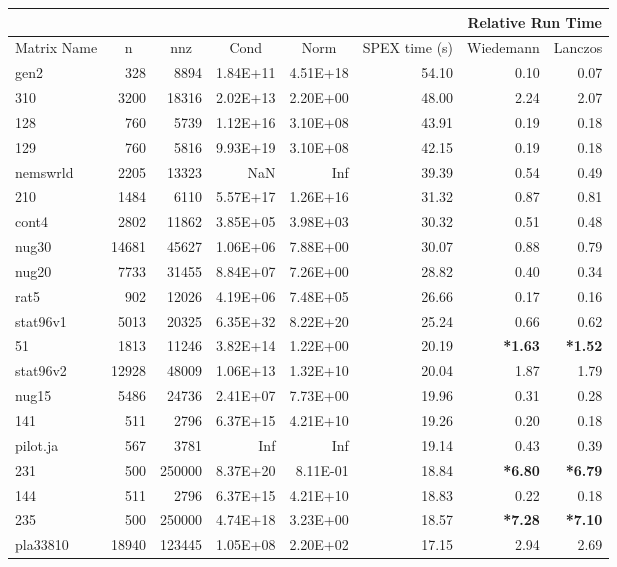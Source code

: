 \documentclass[10pt]{article}
\newcommand{\red}{
	\color{red}	
	}
\begin{document}
\begin{longtable}{|l|r|r|r|r|r|r|r|}
\hline	
& & & & & & \multicolumn{2}{c|}{Relative Run Time}  \\ \hline
\multicolumn{1}{|c|}{Matrix Name}	& \multicolumn{1}{c|}{n} & \multicolumn{1}{c|}{nnz} & \multicolumn{1}{c|}{Cond} & \multicolumn{1}{c|}{Norm} & \multicolumn{1}{c|}{SPEX time (s)} & \multicolumn{1}{c|}{Wiedemann} & \multicolumn{1}{c|}{Lanczos} \\  \hline \endhead
gen2	&	328	&	8894	&	1.84E+11	&	4.51E+18	&	54.10	&	0.10	&	0.07	\\
310	&	3200	&	18316	&	2.02E+13	&	2.20E+00	&	48.00	&	2.24	&	2.07	\\
128	&	760	&	5739	&	1.12E+16	&	3.10E+08	&	43.91	&	0.19	&	0.18	\\
129	&	760	&	5816	&	9.93E+19	&	3.10E+08	&	42.15	&	0.19	&	0.18	\\
nemswrld	&	2205	&	13323	&	NaN	&	Inf	&	39.39	&	0.54	&	0.49	\\
210	&	1484	&	6110	&	5.57E+17	&	1.26E+16	&	31.32	&	0.87	&	0.81	\\
cont4	&	2802	&	11862	&	3.85E+05	&	3.98E+03	&	30.32	&	0.51	&	0.48	\\
nug30	&	14681	&	45627	&	1.06E+06	&	7.88E+00	&	30.07	&	0.88	&	0.79	\\
nug20	&	7733	&	31455	&	8.84E+07	&	7.26E+00	&	28.82	&	0.40	&	0.34	\\
rat5	&	902	&	12026	&	4.19E+06	&	7.48E+05	&	26.66	&	0.17	&	0.16	\\
stat96v1	&	5013	&	20325	&	6.35E+32	&	8.22E+20	&	25.24	&	0.66	&	0.62	\\
51	&	1813	&	11246	&	3.82E+14	&	1.22E+00	&	20.19	&	{\bf \red *1.63}	&	{\bf \red *1.52}	\\
stat96v2	&	12928	&	48009	&	1.06E+13	&	1.32E+10	&	20.04	&	1.87	&	1.79	\\
nug15	&	5486	&	24736	&	2.41E+07	&	7.73E+00	&	19.96	&	0.31	&	0.28	\\
141	&	511	&	2796	&	6.37E+15	&	4.21E+10	&	19.26	&	0.20	&	0.18	\\
pilot.ja	&	567	&	3781	&	Inf	&	Inf	&	19.14	&	0.43	&	0.39	\\
231	&	500	&	250000	&	8.37E+20	&	8.11E-01	&	18.84	&	{\bf \red *6.80}	&	{\bf \red *6.79}	\\
144	&	511	&	2796	&	6.37E+15	&	4.21E+10	&	18.83	&	0.22	&	0.18	\\
235	&	500	&	250000	&	4.74E+18	&	3.23E+00	&	18.57	&	{\bf \red *7.28}	&	{\bf \red *7.10}	\\
pla33810	&	18940	&	123445	&	1.05E+08	&	2.20E+02	&	17.15	&	2.94	&	2.69	\\

\end{longtable}
\end{document}
